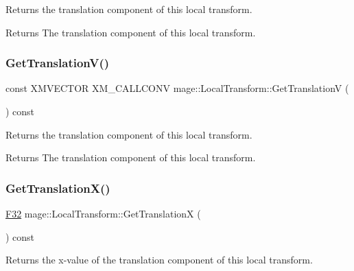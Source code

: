 Returns the translation component of this local transform.

\begin{DoxyReturn}{Returns}
The translation component of this local transform. 
\end{DoxyReturn}
\hypertarget{classmage_1_1_local_transform_a18dc6111bfca7d24f3f24e2c1dff8d0b}{}\label{classmage_1_1_local_transform_a18dc6111bfca7d24f3f24e2c1dff8d0b} 
\subsubsection{\texorpdfstring{Get\+Translation\+V()}{GetTranslationV()}}
{\footnotesize\ttfamily const X\+M\+V\+E\+C\+T\+OR X\+M\+\_\+\+C\+A\+L\+L\+C\+O\+NV mage\+::\+Local\+Transform\+::\+Get\+TranslationV (\begin{DoxyParamCaption}{ }\end{DoxyParamCaption}) const\hspace{0.3cm}{\ttfamily [noexcept]}}

Returns the translation component of this local transform.

\begin{DoxyReturn}{Returns}
The translation component of this local transform. 
\end{DoxyReturn}
\hypertarget{classmage_1_1_local_transform_ae021c17cf996088044a9c4f7be1601b8}{}\label{classmage_1_1_local_transform_ae021c17cf996088044a9c4f7be1601b8} 
\subsubsection{\texorpdfstring{Get\+Translation\+X()}{GetTranslationX()}}
{\footnotesize\ttfamily \hyperlink{namespacemage_aa97e833b45f06d60a0a9c4fc22ae02c0}{F32} mage\+::\+Local\+Transform\+::\+Get\+TranslationX (\begin{DoxyParamCaption}{ }\end{DoxyParamCaption}) const\hspace{0.3cm}{\ttfamily [noexcept]}}

Returns the x-\/value of the translation component of this local transform.

